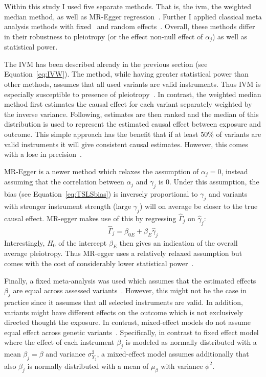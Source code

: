 Within this study I used five separate methods.
That is, the \acrfull{ivm}, the weighted median method, as well as MR-Egger regression~\cite{Bowden2015}.
Further I applied classical meta analysis methods with fixed~\cite{Nelson2015a} and random effects~\cite{Ahmad2015a}.
Overall, these methods differ in their robustness to pleiotropy (or the effect non-null effect of $\alpha_j$) as well as statistical power.

The IVM has been described already in the previous section (see Equation~\ref{eq:IVW}).
The method, while having greater statistical power than other methods, assumes that all used variants are valid instruments.
Thus IVM is especially susceptible to presence of pleiotropy~\cite{Burgess2015b}.
In contrast, the weighted median method first estimates the causal effect for each variant separately weighted by the inverse variance. 
Following, estimates are then ranked and the median of this distribution is used to represent the estimated causal effect between exposure and outcome.
This simple approach has the benefit that if at least 50\% of variants are valid instruments it will give consistent causal estimates.
However, this comes with a lose in precision~\cite{Bowden2015}.

MR-Egger is a newer method which relaxes the assumption of $\alpha_j=0$, instead  assuming that the correlation between $\alpha_j$ and $\gamma_j$ is $0$.
Under this assumption, the bias (see Equation~\ref{eq:TSLSbias}) is inversely proportional to $\gamma_j$ and variants with stronger instrument strength (large $\gamma_j$) will on average be closer to the true causal effect.
MR-egger makes use of this by regressing $\hat{\Gamma}_j$ on $\hat{\gamma}_j$:
\begin{equation}\label{eq:egger}
  \hat{\Gamma}_j = \beta_{0E} + \beta_{E} \hat{\gamma}_j
\end{equation}
Interestingly, $H_0$ of the intercept $\beta_E$ then gives an indication of the overall average pleiotropy.
Thus MR-egger uses a relatively relaxed assumption but comes with the cost of  considerably lower statistical power~\cite{Bowden2015}.

Finally, a fixed meta-analysis was used which assumes that the estimated effects $\beta_j$ are equal across assessed variants~\cite{Burgess2015b}.
However, this might not be the case in practice since it assumes that all selected instruments are valid.
In addition, variants might have different effects on the outcome which is not exclusively directed thought the exposure. 
In contrast, mixed-effect models do not assume equal effect across genetic variants~\cite{Burgess2015b}.
Specifically, in contrast to fixed effect model where the effect of each instrument $\beta_j$ is modeled as normally distributed with a  mean $\beta_j = \beta$ and variance $\sigma_{Y_j}^2$, a mixed-effect model assumes additionally that also $\beta_j$ is normally distributed with a mean of $\mu_\beta$ with variance $\phi^2$.

